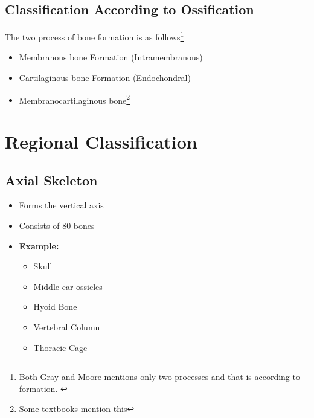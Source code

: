\documentclass[11pt]{article}
\begin{document}
\subsection{Classification According to Ossification}
The two process of bone formation is as follows\footnote{Both Gray and Moore mentions only two processes and that is according to formation.\cite[~.p96]{gray2020} \cite[~.p119]{moore2023}}
\begin{itemize}
    \item Membranous bone Formation (Intramembranous)
    \item Cartilaginous bone Formation (Endochondral)
    \item Membranocartilaginous bone\footnote{Some textbooks mention this}
\end{itemize}

\section{Regional Classification}
\subsection{Axial Skeleton}
\begin{itemize}
    \item Forms the vertical axis
    \item Consists of 80 bones
    \item \textbf{Example:}
    \begin{itemize}
        \item Skull
        \item Middle ear ossicles
        \item Hyoid Bone
        \item Vertebral Column
        \item Thoracic Cage
    \end{itemize}
\end{itemize}
\end{document}
